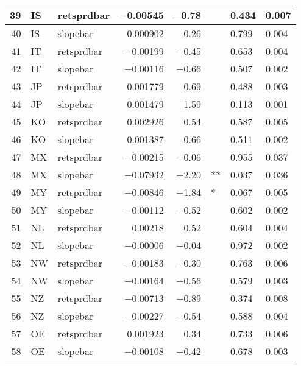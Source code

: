 \begin{longtable}{|r|l|l|r|r|l|l|l|}
   39 &    IS &    retsprdbar &    $-$0.00545 &    $-$0.78 &      &    0.434 &    0.007\\\hline
   40 &    IS &    slopebar &    0.000902 &    0.26 &      &    0.799 &    0.004\\\hline
   41 &    IT &    retsprdbar &    $-$0.00199 &    $-$0.45 &      &    0.653 &    0.004\\\hline
   42 &    IT &    slopebar &    $-$0.00116 &    $-$0.66 &      &    0.507 &    0.002\\\hline
   43 &    JP &    retsprdbar &    0.001779 &    0.69 &      &    0.488 &    0.003\\\hline
   44 &    JP &    slopebar &    0.001479 &    1.59 &      &    0.113 &    0.001\\\hline
   45 &    KO &    retsprdbar &    0.002926 &    0.54 &      &    0.587 &    0.005\\\hline
   46 &    KO &    slopebar &    0.001387 &    0.66 &      &    0.511 &    0.002\\\hline
   47 &    MX &    retsprdbar &    $-$0.00215 &    $-$0.06 &      &    0.955 &    0.037\\\hline
   48 &    MX &    slopebar &    $-$0.07932 &    $-$2.20 &    ** &    0.037 &    0.036\\\hline
   49 &    MY &    retsprdbar &    $-$0.00846 &    $-$1.84 &    * &    0.067 &    0.005\\\hline
   50 &    MY &    slopebar &    $-$0.00112 &    $-$0.52 &      &    0.602 &    0.002\\\hline
   51 &    NL &    retsprdbar &    0.00218 &    0.52 &      &    0.604 &    0.004\\\hline
   52 &    NL &    slopebar &    $-$0.00006 &    $-$0.04 &      &    0.972 &    0.002\\\hline
   53 &    NW &    retsprdbar &    $-$0.00183 &    $-$0.30 &      &    0.763 &    0.006\\\hline
   54 &    NW &    slopebar &    $-$0.00164 &    $-$0.56 &      &    0.579 &    0.003\\\hline
   55 &    NZ &    retsprdbar &    $-$0.00713 &    $-$0.89 &      &    0.374 &    0.008\\\hline
   56 &    NZ &    slopebar &    $-$0.00227 &    $-$0.54 &      &    0.588 &    0.004\\\hline
   57 &    OE &    retsprdbar &    0.001923 &    0.34 &      &    0.733 &    0.006\\\hline
   58 &    OE &    slopebar &    $-$0.00108 &    $-$0.42 &      &    0.678 &    0.003\\\hline

\end{longtable}
